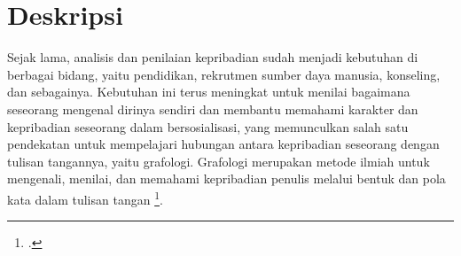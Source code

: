 \documentclass[a4paper,twoside]{article}
\begin{document}
	
	\title{\@judultopik}
	\author{\nama \textendash \@npm} 
	
	\newcommand{\nama}{Owen Lianggara}
	\newcommand{\@npm}{6182301025}
	\newcommand{\@judultopik}{Fuzzy Inference System (FIS) untuk Prediksi Kepribadian Seseorang Berdasarkan Tulisan Tangan} %
	\newcommand{\jumpemb}{1} %
	\newcommand{\tanggal}{06/03/2026}
	
	
	\maketitle

	\vspace{-1cm}
	
	
	\section{Deskripsi}
	Sejak lama, analisis dan penilaian kepribadian sudah menjadi kebutuhan di berbagai bidang, yaitu pendidikan, 
	rekrutmen sumber daya manusia, konseling, dan sebagainya. Kebutuhan ini terus meningkat untuk menilai bagaimana 
	seseorang mengenal dirinya sendiri dan membantu memahami karakter dan kepribadian seseorang dalam bersosialisasi, 
	yang memunculkan salah satu pendekatan untuk mempelajari hubungan antara kepribadian seseorang dengan tulisan tangannya, 
	yaitu grafologi. Grafologi merupakan metode ilmiah untuk mengenali, menilai, dan memahami kepribadian penulis melalui 
	bentuk dan pola kata dalam tulisan tangan \footcite{rahiman2013habit}.
\end{document}
